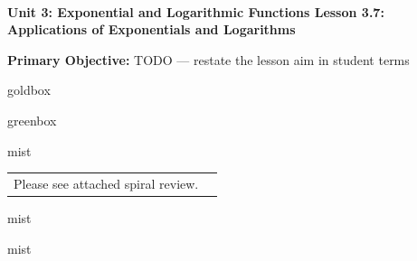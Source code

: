\documentclass[10pt]{article}
\newcommand{\UnitNumberName}{Unit 3: Exponential and Logarithmic Functions \quad}
\newcommand{\LessonNumberName}{Lesson 3.7: Applications of Exponentials and Logarithms}
\begin{document}
\begin{center}
    {\Large\bfseries \CourseName \\
    {\small\bfseries \UnitNumberName \LessonNumberName}}
\end{center}

\begin{tcolorbox}[colback=mist, colframe=royal, boxrule=0.9pt, arc=2mm,
    left=2mm, right=2mm, top=1.5mm, bottom=1.5mm]
    \textbf{Primary Objective:} TODO --- restate the lesson aim in student terms
\end{tcolorbox}

\renewcommand{\arraystretch}{1.6}
\begin{skillbox}{goldbox}
\end{skillbox}

\begin{skillbox}{greenbox}
\end{skillbox}

\begin{fixedskillbox}{mist}
    \begin{tabularx}{\linewidth}{@{}X c@{}}
        \begin{minipage}[t]{0.55\linewidth}\vspace{0pt}
            Please see attached spiral review.  %
        \end{minipage}
        &
        \begin{minipage}[t]{0.38\linewidth}\vspace{0pt}\centering
        \end{minipage}
    \end{tabularx}
\end{fixedskillbox}

\begin{skillbox}[Hook]{mist}
\end{skillbox}

\begin{skillbox}[Lesson]{mist}
\end{skillbox}
\end{document}
